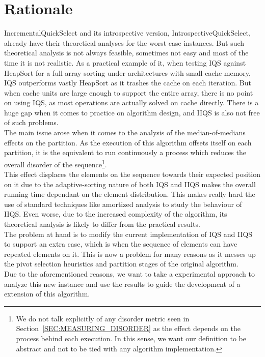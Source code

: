 
\section{Rationale}
IncrementalQuickSelect and its introspective version, IntrospectiveQuickSelect, already have their theoretical analyses for the worst case instances. But such theoretical analysis is not always feasible, sometimes not easy and most of the time it is not realistic. As a practical example of it, when testing IQS against HeapSort for a full array sorting under architectures with small cache memory, IQS outperforms vastly HeapSort as it trashes the cache on each iteration. But when cache units are large enough to support the entire array, there is no point on using IQS, as most operations are actually solved on cache directly. There is a huge gap when it comes to practice on algorithm design, and IIQS is also not free of such problems.\\

The main issue arose when it comes to the analysis of the median-of-medians effects on the partition. As the execution of this algorithm offsets itself on each partition, it is the equivalent to run continuously a process which reduces the overall disorder of the sequence\footnote{We do not talk explicitly of any disorder metric seen in Section~\ref{SEC:MEASURING_DISORDER} as the effect depends on the process behind each execution. In this sense, we want our definition to be abstract and not to be tied with any algorithm implementation.}.\\

This effect displaces the elements on the sequence towards their expected position on it due to the adaptive-sorting nature of both IQS and IIQS makes the overall running time dependant on the element distribution. This makes really hard the use of standard techniques like amortized analysis to study the behaviour of IIQS. Even worse, due to the increased complexity of the algorithm, its theoretical analysis is likely to differ from the practical results.\\

The problem at hand is to modify the current implementation of IQS and IIQS to support an extra case, which is when the sequence of elements can have repeated elements on it. This is now a problem for many reasons as it messes up the pivot selection heuristics and partition stages of the original algorithm.\\

Due to the aforementioned reasons, we want to take a experimental approach to analyze this new instance and use the results to guide the development of a extension of this algorithm.\\

\FloatBarrier